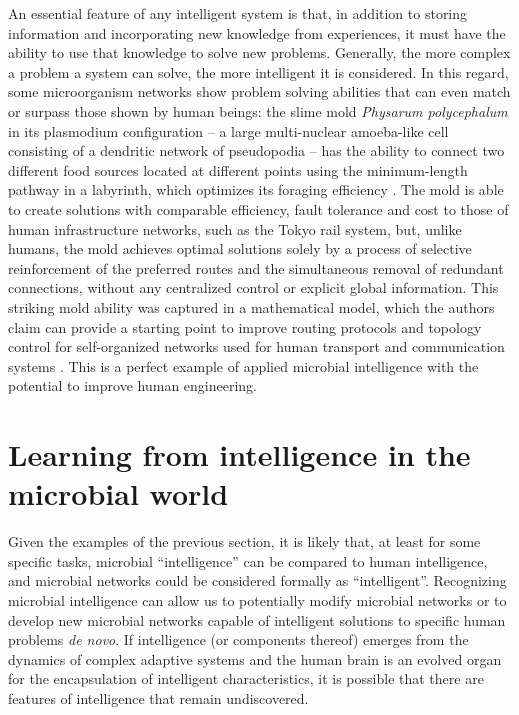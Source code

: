 An essential feature of any intelligent system is that, in addition to storing information and incorporating new knowledge from experiences, it must have the ability to use that knowledge to solve new problems. Generally, the more complex a problem a system can solve, the more intelligent it is considered. In this regard, some microorganism networks show problem solving abilities that can even match or surpass those shown by human beings: the slime mold \textit{Physarum polycephalum} in its plasmodium configuration – a large multi-nuclear amoeba-like cell consisting of a dendritic network of pseudopodia – has the ability to connect two different food sources located at different points using the minimum-length pathway in a labyrinth, which optimizes its foraging efficiency \cite{nakagaki_interaction_2000}. The mold is able to create solutions with comparable efficiency, fault tolerance and cost to those of human infrastructure networks, such as the Tokyo rail system, but, unlike humans, the mold achieves optimal solutions solely by a process of selective reinforcement of the preferred routes and the simultaneous removal of redundant connections, without any centralized control or explicit global information. This striking mold ability was captured in a mathematical model, which the authors claim can provide a starting point to improve routing protocols and topology control for self-organized networks used for human transport and communication systems \cite{atsushi_tero_method_2010}. This is a perfect example of applied microbial intelligence with the potential to improve human engineering.

\section{Learning from intelligence in the microbial world}

Given the examples of the previous section, it is likely that, at least for some specific tasks, microbial ``intelligence'' can be compared to human intelligence, and microbial networks could be considered formally as ``intelligent''. Recognizing microbial intelligence can allow us to potentially modify microbial networks or to develop new microbial networks capable of intelligent solutions to specific human problems \textit{de novo}. If intelligence (or components thereof) emerges from the dynamics of complex adaptive systems and the human brain is an evolved organ for the encapsulation of intelligent characteristics, it is possible that there are features of intelligence that remain undiscovered.

